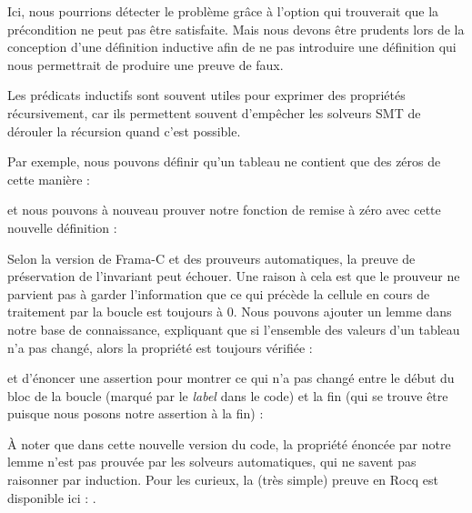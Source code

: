



Ici, nous pourrions détecter le problème grâce à l'option 
qui trouverait que la précondition ne peut pas être satisfaite. Mais nous devons
être prudents lors de la conception d'une définition inductive afin de ne pas
introduire une définition qui nous permettrait de produire une preuve de faux.






Les prédicats inductifs sont souvent utiles pour exprimer des propriétés
récursivement, car ils permettent souvent d'empêcher les solveurs SMT de
dérouler la récursion quand c'est possible.


Par exemple, nous pouvons définir qu'un tableau ne contient que des zéros de
cette manière :




et nous pouvons à nouveau prouver notre fonction de remise à zéro avec cette
nouvelle définition :






Selon la version de Frama-C et des prouveurs automatiques, la preuve de
préservation de l'invariant peut échouer. Une raison à cela est que le prouveur ne
parvient pas à garder l'information que ce qui précède la cellule en cours de
traitement par la boucle est toujours à 0. Nous pouvons ajouter un lemme dans
notre base de connaissance, expliquant que si l'ensemble des valeurs d'un tableau
n'a pas changé, alors la propriété est toujours vérifiée :






et d'énoncer une assertion pour montrer ce qui n'a pas changé entre le début
du bloc de la boucle (marqué par le \textit{label}  dans le code)
et la fin (qui se trouve être  puisque nous posons notre
assertion à la fin) :






À noter que dans cette nouvelle version du code, la propriété énoncée par notre
lemme n'est pas prouvée par les solveurs automatiques, qui ne savent pas raisonner
par induction. Pour les curieux, la (très simple) preuve en Rocq est disponible
ici : .



